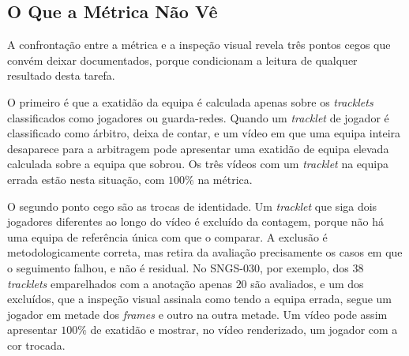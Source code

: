 \subsection{O Que a Métrica Não Vê}\label{sec:res_equipa_metrica}

A confrontação entre a métrica e a inspeção visual revela três pontos cegos que convém deixar
documentados, porque condicionam a leitura de qualquer resultado desta tarefa.

O primeiro é que a exatidão da equipa é calculada apenas sobre os \emph{tracklets} classificados
como jogadores ou guarda-redes. Quando um \emph{tracklet} de jogador é classificado como árbitro,
deixa de contar, e um vídeo em que uma equipa inteira desaparece para a arbitragem pode apresentar
uma exatidão de equipa elevada calculada sobre a equipa que sobrou. Os três vídeos com um
\emph{tracklet} na equipa errada estão nesta situação, com $100\%$ na métrica.

O segundo ponto cego são as trocas de identidade. Um \emph{tracklet} que siga dois jogadores
diferentes ao longo do vídeo é excluído da contagem, porque não há uma equipa de referência única
com que o comparar. A exclusão é metodologicamente correta, mas retira da avaliação precisamente os
casos em que o seguimento falhou, e não é residual. No SNGS-030, por exemplo, dos $38$ \emph{tracklets}
emparelhados com a anotação apenas $20$ são avaliados, e um dos excluídos, que a inspeção visual
assinala como tendo a equipa errada, segue um jogador em metade dos \emph{frames} e outro na outra
metade. Um vídeo pode assim apresentar $100\%$ de exatidão e mostrar, no vídeo renderizado, um
jogador com a cor trocada.

